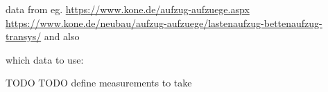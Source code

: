 data from eg. \url{https://www.kone.de/aufzug-aufzuege.aspx} \url{https://www.kone.de/neubau/aufzug-aufzuege/lastenaufzug-bettenaufzug-transys/}
and also \autocite[][p.~349]{barney2016handbook}

which data to use: \autocite[][p.~347]{barney2016handbook}

TODO
TODO define measurements to take
 

